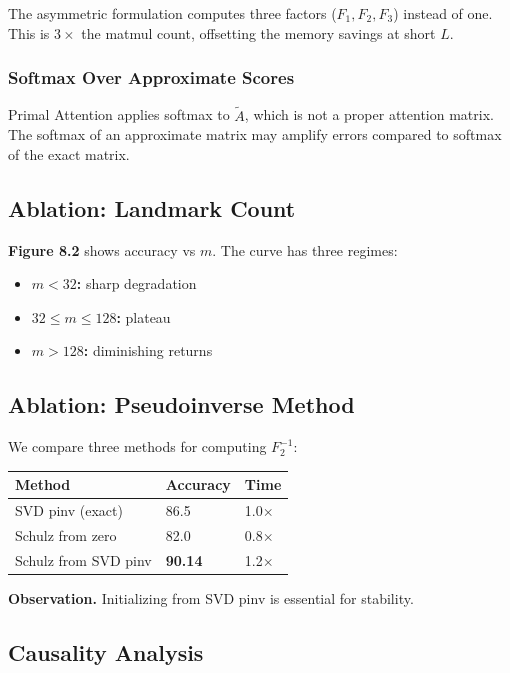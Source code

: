 The asymmetric formulation computes three factors ($F_1, F_2, F_3$) instead 
of one. This is $3\times$ the matmul count, offsetting the memory savings 
at short $L$.

\subsubsection{Softmax Over Approximate Scores}

Primal Attention applies softmax to $\tilde{A}$, which is not a proper 
attention matrix. The softmax of an approximate matrix may amplify errors 
compared to softmax of the exact matrix.

\subsection{Ablation: Landmark Count}

\textbf{Figure 8.2} shows accuracy vs $m$. The curve has three regimes:

\begin{itemize}
\item \textbf{$m < 32$:} sharp degradation
\item \textbf{$32 \le m \le 128$:} plateau
\item \textbf{$m > 128$:} diminishing returns

\end{itemize}
\subsection{Ablation: Pseudoinverse Method}

We compare three methods for computing $F_2^{-1}$:

\begin{table}[H]
\centering
\small
\begin{tabular}{lll}
\toprule
\textbf{Method} & \textbf{Accuracy} & \textbf{Time} \\
\midrule
SVD pinv (exact) & 86.5 & 1.0$\times$ \\
Schulz from zero & 82.0 & 0.8$\times$ \\
Schulz from SVD pinv & \textbf{90.14} & 1.2$\times$ \\
\bottomrule
\end{tabular}
\end{table}

\textbf{Observation.} Initializing from SVD pinv is essential for stability.

\subsection{Causality Analysis}

